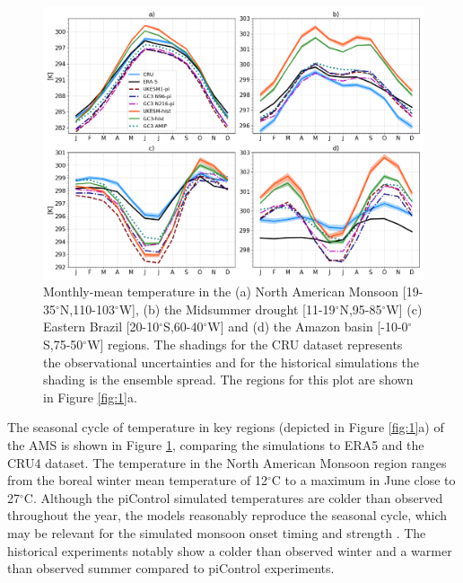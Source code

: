 
\begin{figure}[t!]
\centering
 \includegraphics[width=\linewidth]{figures/p2fig2_v3.png}
\caption[Seasonal cycle of surface temperature in key monsoon regions]{ Monthly-mean temperature in the (a) North American Monsoon [19-35$^\circ$N,110-103$^\circ$W], (b) the Midsummer drought [11-19$^\circ$N,95-85$^\circ$W] (c) Eastern Brazil [20-10$^\circ$S,60-40$^\circ$W] and (d) the Amazon basin [-10-0$^\circ$S,75-50$^\circ$W] regions. The shadings for the CRU dataset represents the observational uncertainties and for the historical simulations the shading is the ensemble spread. The regions for this plot are shown in Figure \ref{fig:1}a. }
\label{fig:2}
\end{figure}

The seasonal cycle of temperature in key regions (depicted in Figure \ref{fig:1}a) of the AMS is shown in Figure \ref{fig:2}, comparing the simulations to ERA5 and the CRU4 dataset.
The temperature in the North American Monsoon region ranges from the boreal winter mean temperature of 12$^\circ$C to a maximum in June close to 27$^\circ$C.
Although the piControl simulated temperatures are colder than observed throughout the year, the models reasonably reproduce the seasonal cycle, which may be relevant for the simulated monsoon onset timing and strength \citep{turrent2009}. The historical experiments notably show a colder than observed winter and a warmer than observed summer compared to piControl experiments.

